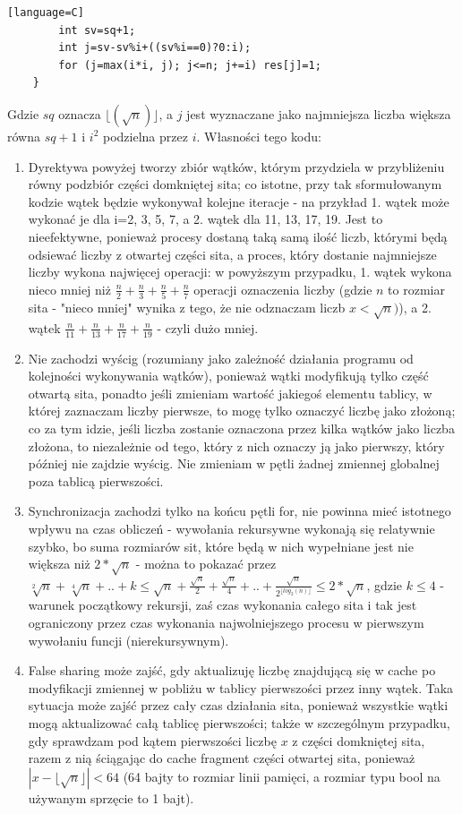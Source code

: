 \documentclass[12pt]{article}
\begin{document}
\begin {enumerate}
\begin{lstlisting}[style=mystyle, caption= Sito funkcyjne ze static schedulingiem][language=C]
		int sv=sq+1;
		int j=sv-sv%i+((sv%i==0)?0:i);
		for (j=max(i*i, j); j<=n; j+=i) res[j]=1;
	}
	\end{lstlisting}
	Gdzie \(sq\) oznacza \(\lfloor(\sqrt{n})\rfloor\), a \(j\) jest wyznaczane jako najmniejsza liczba większa równa \(sq+1\) i \(i^2\) podzielna przez \(i\). Własności tego kodu:
	\begin{enumerate}
		\item Dyrektywa powyżej tworzy zbiór wątków, którym przydziela w przybliżeniu równy podzbiór części domkniętej sita; co istotne, przy tak sformułowanym kodzie wątek będzie wykonywał kolejne iteracje - na przykład 1. wątek może wykonać je dla i=2, 3, 5, 7, a 2. wątek dla 11, 13, 17, 19. Jest to nieefektywne, ponieważ procesy dostaną taką samą ilość liczb, którymi będą odsiewać liczby z otwartej części sita, a proces, który dostanie najmniejsze liczby wykona najwięcej operacji: w powyższym przypadku, 1. wątek wykona nieco mniej niż \(\frac{n}{2}+\frac{n}{3}+\frac{n}{5}+\frac{n}{7}\) operacji oznaczenia liczby (gdzie \(n\) to rozmiar sita - "nieco mniej" wynika z tego, że nie odznaczam liczb \(x<\sqrt{n})\)), a 2. wątek \(\frac{n}{11}+\frac{n}{13}+\frac{n}{17}+\frac{n}{19}\) - czyli dużo mniej.
		\item Nie zachodzi wyścig (rozumiany jako zależność działania programu od kolejności wykonywania wątków), ponieważ wątki modyfikują tylko część otwartą sita, ponadto jeśli zmieniam wartość jakiegoś elementu tablicy, w której zaznaczam liczby pierwsze, to mogę tylko oznaczyć liczbę jako złożoną; co za tym idzie, jeśli liczba zostanie oznaczona przez kilka wątków jako liczba złożona, to niezależnie od tego, który z nich oznaczy ją jako pierwszy, który później nie zajdzie wyścig. Nie zmieniam w pętli żadnej zmiennej globalnej poza tablicą pierwszości.
		\item Synchronizacja zachodzi tylko na końcu pętli for, nie powinna mieć istotnego wpływu na czas obliczeń - wywołania rekursywne wykonają się relatywnie szybko, bo suma rozmiarów sit, które będą w nich wypełniane jest nie większa niż \(2*\sqrt{n}\) - można to pokazać przez \(\sqrt[2]{n}+\sqrt[4]{n}+..+k\le\sqrt{n}+\frac{\sqrt{n}}{2}+\frac{\sqrt{n}}{4}+..+\frac{\sqrt{n}}{2^{\lfloor log_2(n) \rfloor}}\le 2*\sqrt{n}\), gdzie \(k \le 4\) - warunek początkowy rekursji, zaś czas wykonania całego sita i tak jest ograniczony przez czas wykonania najwolniejszego procesu w pierwszym wywołaniu funcji (nierekursywnym).
		\item False sharing może zajść, gdy aktualizuję liczbę znajdującą się w cache po modyfikacji zmiennej w pobliżu w tablicy pierwszości przez inny wątek. Taka sytuacja może zajść przez cały czas działania sita, ponieważ wszystkie wątki mogą aktualizować całą tablicę pierwszości; także w szczególnym przypadku, gdy sprawdzam pod kątem pierwszości liczbę \(x\) z części domkniętej sita, razem z nią ściągając do cache fragment części otwartej sita, ponieważ \(|x-\lfloor\sqrt{n}\rfloor|<64\) (64 bajty to rozmiar linii pamięci, a rozmiar typu bool na używanym sprzęcie to 1 bajt).

\end{enumerate}
\end{enumerate}
\end{document}
